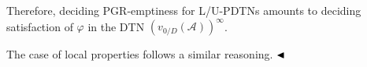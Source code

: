    
Therefore, deciding PGR-emptiness for L/U-PDTNs amounts to deciding satisfaction of $\varphi$ in the DTN ${(v_{0/D}(\mathcal{A}))}^{\infty}$.\par
 
 
 
The case of local properties follows a similar reasoning. $\hfill\blacktriangleleft$\par
 
 
 
\par
 
 
 
 
